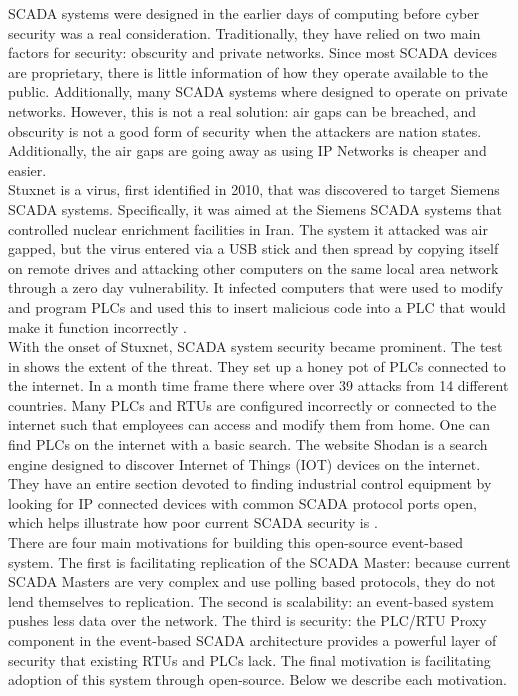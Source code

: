\documentclass[oneside,11pt,a4paper,oldfontcommands]{book}
\begin{document}
\indent 
SCADA systems were designed in the earlier days of computing before cyber security was
a real consideration. Traditionally, they have relied on two main factors for security:
obscurity and private networks. Since most SCADA devices are proprietary, there
is little information of how they operate available to the public. Additionally, many
SCADA systems where designed to operate on private networks. However, this
is not a real solution: air gaps can be breached, and obscurity is
not a good form of security when the attackers are nation states. Additionally,
the air gaps are going away as using IP Networks is cheaper and easier. \\

Stuxnet is a virus, first identified in 2010, that was discovered to
target Siemens SCADA systems. Specifically, it was aimed at the
Siemens SCADA systems that controlled nuclear enrichment facilities in Iran.
The system it attacked was air gapped, but the virus entered via a USB
stick and then spread by copying itself on
remote drives and attacking other computers on the same local area network through
a zero day vulnerability. It infected computers that
were used to modify and program PLCs and used this to insert malicious code
into a PLC that would make it function incorrectly \cite{Stuxnet}. \\

With the onset of Stuxnet, SCADA system security became prominent. The test in \cite{WhosAttacking} shows
the extent of the threat. They set up a honey pot of PLCs connected to the internet.
In a month time frame there where over 39 attacks from 14 different countries. 
Many PLCs and RTUs are configured incorrectly or connected to the
internet such that employees can access and modify them from home. One can
find PLCs on the internet with a basic search. The website Shodan is a 
search engine designed to discover Internet of Things (IOT) devices on the internet.
They have an entire section devoted to finding industrial control equipment by looking for
IP connected devices with common SCADA protocol ports open, which helps
illustrate how poor current SCADA security is \cite{Shodan}. \\

\indent 
There are four main motivations for building this open-source
event-based system. The first is facilitating replication of the SCADA Master:
 because current SCADA Masters are very complex and use polling based protocols,
 they do not lend themselves to replication.
The second is scalability: an event-based system pushes less
data over the network.
The third is security: the PLC/RTU Proxy component in the event-based SCADA architecture
provides a powerful layer of security that existing RTUs and PLCs lack. 
The final motivation is facilitating adoption of this system through open-source. Below
we describe each motivation.\\
\end{document}
